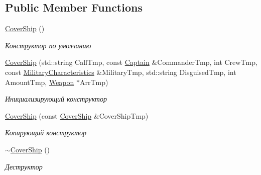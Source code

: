 \subsection*{Public Member Functions}
\begin{DoxyCompactItemize}
\item 
\mbox{\label{class_aircraft_carrier_group_1_1_cover_ship_aa6c11517d19279d5a7387a1efc2f7a0f}} 
\mbox{\hyperlink{class_aircraft_carrier_group_1_1_cover_ship_aa6c11517d19279d5a7387a1efc2f7a0f}{Cover\+Ship}} ()
\begin{DoxyCompactList}\small\item\em Конструктор по умолчанию \end{DoxyCompactList}\item 
\mbox{\hyperlink{class_aircraft_carrier_group_1_1_cover_ship_a3735bd14678da33bd128266774d21f64}{Cover\+Ship}} (std\+::string Call\+Tmp, const \mbox{\hyperlink{struct_aircraft_carrier_group_1_1_captain}{Captain}} \&Commander\+Tmp, int Crew\+Tmp, const \mbox{\hyperlink{class_aircraft_carrier_group_1_1_military_characteristics}{Military\+Characteristics}} \&Military\+Tmp, std\+::string Disguised\+Tmp, int Amount\+Tmp, \mbox{\hyperlink{class_aircraft_carrier_group_1_1_weapon}{Weapon}} $\ast$Arr\+Tmp)
\begin{DoxyCompactList}\small\item\em Инициализирующий конструктор \end{DoxyCompactList}\item 
\mbox{\hyperlink{class_aircraft_carrier_group_1_1_cover_ship_a2d57e8dba8f2e9abc30dececa2d7cfe2}{Cover\+Ship}} (const \mbox{\hyperlink{class_aircraft_carrier_group_1_1_cover_ship}{Cover\+Ship}} \&Cover\+Ship\+Tmp)
\begin{DoxyCompactList}\small\item\em Копирующий конструктор \end{DoxyCompactList}\item 
\mbox{\label{class_aircraft_carrier_group_1_1_cover_ship_a495afaecdaac83ce1358abbded27e226}} 
\mbox{\hyperlink{class_aircraft_carrier_group_1_1_cover_ship_a495afaecdaac83ce1358abbded27e226}{$\sim$\+Cover\+Ship}} ()
\begin{DoxyCompactList}\small\item\em Деструктор \end{DoxyCompactList}\item 

\end{DoxyCompactItemize}
